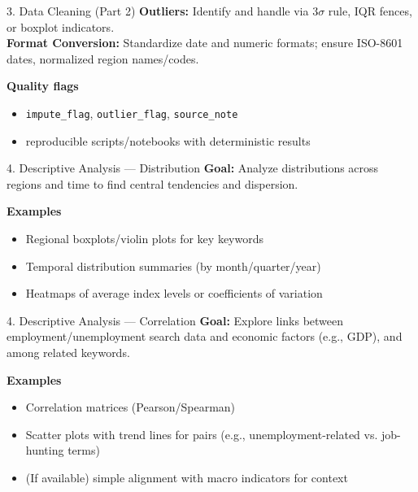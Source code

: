 \documentclass[aspectratio=169,11pt]{beamer}
\begin{document}
	\begin{frame}{3. Data Cleaning (Part 2)}
		\small
		\textbf{Outliers:} Identify and handle via \(3\sigma\) rule, IQR fences, or boxplot indicators. \\
		\textbf{Format Conversion:} Standardize date and numeric formats; ensure ISO-8601 dates, normalized region names/codes.
		\medskip
		
		\textbf{Quality flags}
		\begin{itemize}
			\item \texttt{impute\_flag}, \texttt{outlier\_flag}, \texttt{source\_note}
			\item reproducible scripts/notebooks with deterministic results
		\end{itemize}
	\end{frame}
	
	\begin{frame}{4. Descriptive Analysis — Distribution}
		\small
		\textbf{Goal:} Analyze distributions across regions and time to find central tendencies and dispersion.
		\medskip
		
		\textbf{Examples}
		\begin{itemize}
			\item Regional boxplots/violin plots for key keywords
			\item Temporal distribution summaries (by month/quarter/year)
			\item Heatmaps of average index levels or coefficients of variation
		\end{itemize}
	\end{frame}
	
	\begin{frame}{4. Descriptive Analysis — Correlation}
		\small
		\textbf{Goal:} Explore links between employment/unemployment search data and economic factors (e.g., GDP), and among related keywords.
		\medskip
		
		\textbf{Examples}
		\begin{itemize}
			\item Correlation matrices (Pearson/Spearman)
			\item Scatter plots with trend lines for pairs (e.g., unemployment-related vs. job-hunting terms)
			\item (If available) simple alignment with macro indicators for context
		\end{itemize}
	\end{frame}
	
\end{document}

